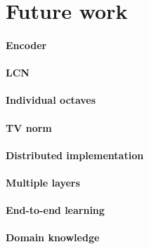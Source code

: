 \documentclass[a4paper,12pt,twoside]{report}
\begin{document}
\section*{Future work}

\paragraph{Encoder}

\paragraph{LCN}

\paragraph{Individual octaves}

\paragraph{TV norm}

\paragraph{Distributed implementation}

\paragraph{Multiple layers}

\paragraph{End-to-end learning}

\paragraph{Domain knowledge}
\end{document}
